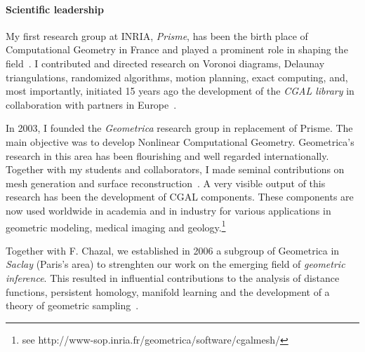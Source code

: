 
\paragraph{Scientific leadership} \mbox{}


My first research group at INRIA, {\em Prisme}, has been the birth place of Computational Geometry in France and played a prominent role in shaping the field~\cite{by-ag-98}. 
I contributed and directed research on Voronoi diagrams, Delaunay triangulations, randomized algorithms, motion planning, exact computing, and, most importantly, initiated 15 years ago the development of the {\em CGAL library} in collaboration with partners in Europe~\cite{cgal}.

In 2003, I founded the {\em Geometrica} research group in replacement of Prisme. The main objective was to develop Nonlinear Computational Geometry. 
 Geometrica's research in this area has been flourishing and well regarded internationally. Together with my students and collaborators, I made seminal contributions on mesh generation and surface reconstruction~\cite{geometrica-ecg-book}. A very visible output of this research has been the development of CGAL components. These components are now used worldwide in academia and in industry for various applications in geometric modeling, medical imaging and geology.\footnote{see http://www-sop.inria.fr/geometrica/software/cgalmesh/}

Together with F. Chazal, we established in 2006 a subgroup of Geometrica in {\em Saclay} (Paris's area)  to strenghten our work on  the emerging field of {\em geometric inference}.  This resulted in influential contributions to the analysis of distance functions, persistent homology, manifold learning and the development of a theory of geometric sampling~\cite{geometrica-bgo-09,geometrica-ccl09}.
\newpage


